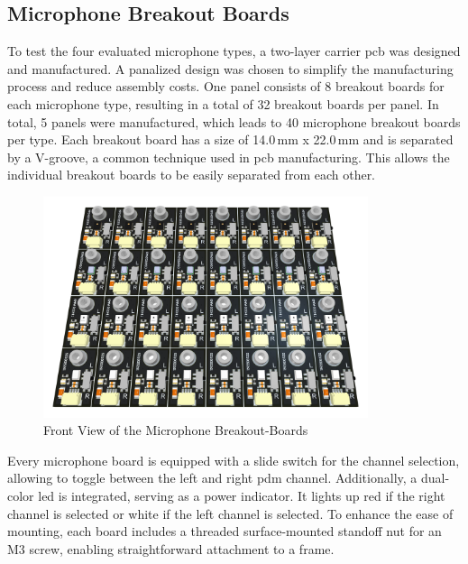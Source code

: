 \subsection{Microphone Breakout Boards}
To test the four evaluated microphone types, a two-layer carrier \acrshort{pcb} was designed and manufactured.
A panalized design was chosen to simplify the manufacturing process and reduce assembly costs.
One panel consists of 8 breakout boards for each microphone type, resulting in a total of 32 breakout boards per panel.
In total, 5 panels were manufactured, which leads to 40 microphone breakout boards per type.
Each breakout board has a size of 14.0\,mm x 22.0\,mm and is separated by a V-groove, a common technique used in \acrshort{pcb} manufacturing.
This allows the individual breakout boards to be easily separated from each other.
\begin{figure}
	\centering
	\includegraphics[width=0.85\textwidth]{images/4_design_acquisition_system/Microphone_Boards_Front.png}
	\caption{Front View of the Microphone Breakout-Boards}
	\label{fig:microphone_boards_front}
\end{figure}

Every microphone board is equipped with a slide switch for the channel selection, allowing to toggle between the left and right \acrshort{pdm} channel.
Additionally, a dual-color \acrshort{led} is integrated, serving as a power indicator. It lights up red if the right channel is selected or white if the left channel is selected.
To enhance the ease of mounting, each board includes a threaded surface-mounted standoff nut for an M3 screw, enabling straightforward attachment to a frame.

